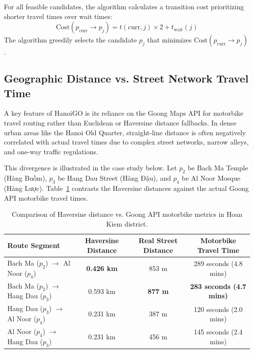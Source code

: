For all feasible candidates, the algorithm calculates a transition cost prioritizing shorter travel times over wait times:
\begin{equation}
\text{Cost}(p_{\text{curr}} \to p_j) = t(\text{curr}, j) \times 2 + t_{\text{wait}}(j)
\end{equation}
The algorithm greedily selects the candidate $p_j$ that minimizes $\text{Cost}(p_{\text{curr}} \to p_j)$.

\subsection{Geographic Distance vs. Street Network Travel Time}

A key feature of HanoiGO is its reliance on the Goong Maps API for motorbike travel routing rather than Euclidean or Haversine distance fallbacks. In dense urban areas like the Hanoi Old Quarter, straight-line distance is often negatively correlated with actual travel times due to complex street networks, narrow alleys, and one-way traffic regulations.

This divergence is illustrated in the case study below. Let $p_2$ be Bach Ma Temple (Hàng Buồm), $p_3$ be Hang Dau Street (Hàng Đậu), and $p_4$ be Al Noor Mosque (Hàng Lược). 
Table~\ref{tab:distance_travel_comparison} contrasts the Haversine distances against the actual Goong API motorbike travel times.

\begin{table}[H]
\centering
\small
\renewcommand{\arraystretch}{1.2}
\begin{tabular}{|l|c|c|c|}
\hline
\textbf{Route Segment} & \textbf{Haversine Distance} & \textbf{Real Street Distance} & \textbf{Motorbike Travel Time} \\ \hline
Bach Ma ($p_2$) $\to$ Al Noor ($p_4$) & \textbf{0.426 km} & 853 m & 289 seconds (4.8 mins) \\ \hline
Bach Ma ($p_2$) $\to$ Hang Dau ($p_3$) & 0.593 km & \textbf{877 m} & \textbf{283 seconds (4.7 mins)} \\ \hline
Hang Dau ($p_3$) $\to$ Al Noor ($p_4$) & 0.231 km & 387 m & 120 seconds (2.0 mins) \\ \hline
Al Noor ($p_4$) $\to$ Hang Dau ($p_3$) & 0.231 km & 456 m & 145 seconds (2.4 mins) \\ \hline
\end{tabular}
\caption{Comparison of Haversine distance vs. Goong API motorbike metrics in Hoan Kiem district.}
\label{tab:distance_travel_comparison}
\end{table}

